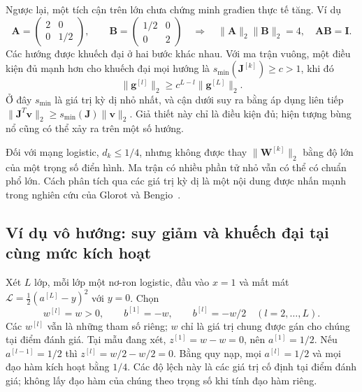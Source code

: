 Ngược lại, một tích cận trên lớn chưa chứng minh građien thực tế
tăng. Ví dụ
\begin{equation}
 \mathbf A=\begin{pmatrix}2&0\\0&1/2\end{pmatrix},\qquad
 \mathbf B=\begin{pmatrix}1/2&0\\0&2\end{pmatrix}
 \quad\Longrightarrow\quad
 \|\mathbf A\|_2\|\mathbf B\|_2=4,
 \quad\mathbf A\mathbf B=\mathbf I.
 \label{kt:eq:matrix-counterexample}
\end{equation}
Các hướng được khuếch đại ở hai bước khác nhau. Với ma trận vuông,
một điều kiện đủ mạnh hơn cho khuếch đại mọi hướng là
$s_{\min}(\mathbf J^{[k]})\geq c>1$, khi đó
\begin{equation}
 \|\mathbf g^{[l]}\|_2\geq c^{L-l}\|\mathbf g^{[L]}\|_2.
 \label{kt:eq:gradient-expansion}
\end{equation}
Ở đây $s_{\min}$ là giá trị kỳ dị nhỏ nhất, và cận dưới suy ra bằng
áp dụng liên tiếp $\|\mathbf J^T\mathbf v\|_2\geq
s_{\min}(\mathbf J)\|\mathbf v\|_2$. Giả thiết này chỉ là điều
kiện đủ; hiện tượng bùng nổ cũng có thể xảy ra trên một số hướng.

Đối với mạng logistic, $d_k\leq1/4$, nhưng không được thay
$\|\mathbf W^{[k]}\|_2$ bằng độ lớn của một trọng số điển hình.
Ma trận có nhiều phần tử nhỏ vẫn có thể có chuẩn phổ lớn. Cách
phân tích qua các giá trị kỳ dị là một nội dung được nhấn mạnh
trong nghiên cứu của Glorot và Bengio~\cite{glorot2010}.

\subsection{Ví dụ vô hướng: suy giảm và khuếch đại tại cùng mức kích hoạt}

Xét $L$ lớp, mỗi lớp một nơ-ron logistic, đầu vào $x=1$ và mất
mát $\mathcal L=\tfrac12(a^{[L]}-y)^2$ với $y=0$. Chọn
\begin{equation}
 w^{[l]}=w>0,\qquad b^{[1]}=-w,
 \qquad b^{[l]}=-w/2\quad(l=2,\ldots,L).
 \label{kt:eq:scalar-construction}
\end{equation}
Các $w^{[l]}$ vẫn là những tham số riêng; $w$ chỉ là giá trị chung
được gán cho chúng tại điểm đánh giá. Tại mẫu đang xét,
$z^{[1]}=w-w=0$, nên $a^{[1]}=1/2$.
Nếu $a^{[l-1]}=1/2$ thì $z^{[l]}=w/2-w/2=0$.
Bằng quy nạp, mọi $a^{[l]}=1/2$ và mọi đạo hàm kích hoạt bằng
$1/4$. Các độ lệch này là các giá trị cố định tại điểm đánh giá;
không lấy đạo hàm của chúng theo trọng số khi tính đạo hàm riêng.

